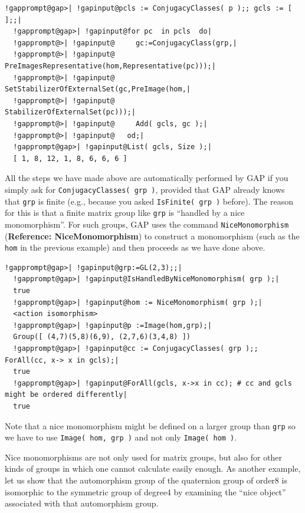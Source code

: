 \documentclass[a4paper,11pt]{report}
\begin{document}
{{ 
\begin{Verbatim}[commandchars=!@|,fontsize=\small,frame=single,label=Example]
  !gapprompt@gap>| !gapinput@pcls := ConjugacyClasses( p );; gcls := [  ];;|
  !gapprompt@gap>| !gapinput@for pc  in pcls  do|
  !gapprompt@>| !gapinput@     gc:=ConjugacyClass(grp,|
  !gapprompt@>| !gapinput@                  PreImagesRepresentative(hom,Representative(pc)));|
  !gapprompt@>| !gapinput@     SetStabilizerOfExternalSet(gc,PreImage(hom,|
  !gapprompt@>| !gapinput@                                     StabilizerOfExternalSet(pc)));|
  !gapprompt@>| !gapinput@     Add( gcls, gc );|
  !gapprompt@>| !gapinput@   od;|
  !gapprompt@gap>| !gapinput@List( gcls, Size );|
  [ 1, 8, 12, 1, 8, 6, 6, 6 ]
\end{Verbatim}
 

 All the steps we have made above are automatically performed by \textsf{GAP} if you simply ask for \texttt{ConjugacyClasses( grp )}, provided that \textsf{GAP} already knows that \texttt{grp} is finite (e.g., because you asked \texttt{IsFinite( grp )} before). The reason for this is that a finite matrix group like \texttt{grp} is ``handled by a nice monomorphism''. For such groups, \textsf{GAP} uses the command \texttt{NiceMonomorphism} (\textbf{Reference: NiceMonomorphism}) to construct a monomorphism (such as the \texttt{hom} in the previous example) and then proceeds as we have done above. 

 
\begin{Verbatim}[commandchars=!@|,fontsize=\small,frame=single,label=Example]
  !gapprompt@gap>| !gapinput@grp:=GL(2,3);;|
  !gapprompt@gap>| !gapinput@IsHandledByNiceMonomorphism( grp );|
  true
  !gapprompt@gap>| !gapinput@hom := NiceMonomorphism( grp );|
  <action isomorphism>
  !gapprompt@gap>| !gapinput@p :=Image(hom,grp);|
  Group([ (4,7)(5,8)(6,9), (2,7,6)(3,4,8) ])
  !gapprompt@gap>| !gapinput@cc := ConjugacyClasses( grp );; ForAll(cc, x-> x in gcls);|
  true
  !gapprompt@gap>| !gapinput@ForAll(gcls, x->x in cc); # cc and gcls might be ordered differently|
  true
\end{Verbatim}
 

 Note that a nice monomorphism might be defined on a larger group than \texttt{grp} {\textendash}so we have to use \texttt{Image( hom, grp )} and not only \texttt{Image( hom )}. 

 Nice monomorphisms are not only used for matrix groups, but also for other
kinds of groups in which one cannot calculate easily enough. As another
example, let us show that the automorphism group of the quaternion group of
order{\nobreakspace}8 is isomorphic to the symmetric group of
degree{\nobreakspace}4 by examining the ``nice object'' associated with that automorphism group. 

}}
\end{document}
